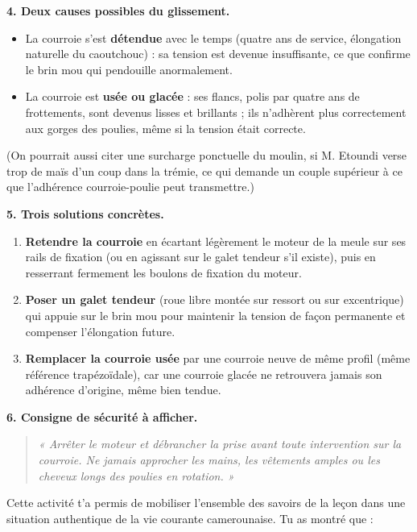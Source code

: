 \documentclass[11pt]{article}
\newcounter{popsec}
\newcounter{popsub}
\newcommand{\courssub}[1]{%
  \stepcounter{popsub}%
  \par\vspace{9pt}\noindent{\popxbold\fontsize{11.5}{13}\selectfont\color{popink}{\color{poporange}\thepopsec.\thepopsub}\hspace{6pt}#1}\par\nopagebreak\vspace{4pt}
}
\begin{document}
\begin{exoresolu}
\textbf{4. Deux causes possibles du glissement.}

\begin{itemize}
\item La courroie s'est \textbf{détendue} avec le temps (quatre ans de service, élongation naturelle du caoutchouc) : sa tension est devenue insuffisante, ce que confirme le brin mou qui pendouille anormalement.
\item La courroie est \textbf{usée ou glacée} : ses flancs, polis par quatre ans de frottements, sont devenus lisses et brillants ; ils n'adhèrent plus correctement aux gorges des poulies, même si la tension était correcte.
\end{itemize}

(On pourrait aussi citer une surcharge ponctuelle du moulin, si M. Etoundi verse trop de maïs d'un coup dans la trémie, ce qui demande un couple supérieur à ce que l'adhérence courroie-poulie peut transmettre.)

\textbf{5. Trois solutions concrètes.}

\begin{enumerate}
\item \textbf{Retendre la courroie} en écartant légèrement le moteur de la meule sur ses rails de fixation (ou en agissant sur le galet tendeur s'il existe), puis en resserrant fermement les boulons de fixation du moteur.
\item \textbf{Poser un galet tendeur} (roue libre montée sur ressort ou sur excentrique) qui appuie sur le brin mou pour maintenir la tension de façon permanente et compenser l'élongation future.
\item \textbf{Remplacer la courroie usée} par une courroie neuve de même profil (même référence trapézoïdale), car une courroie glacée ne retrouvera jamais son adhérence d'origine, même bien tendue.
\end{enumerate}

\textbf{6. Consigne de sécurité à afficher.}

\begin{quote}
\emph{« Arrêter le moteur et débrancher la prise avant toute intervention sur la courroie. Ne jamais approcher les mains, les vêtements amples ou les cheveux longs des poulies en rotation. »}
\end{quote}
\end{exoresolu}

\courssub{Bilan de l'activité}

Cette activité t'a permis de mobiliser l'ensemble des savoirs de la leçon dans une situation authentique de la vie courante camerounaise. Tu as montré que :
\end{document}
